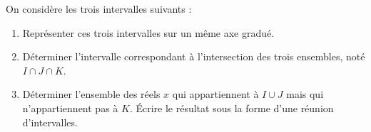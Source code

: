 \begin{exo}{}
	On considère les trois intervalles suivants :
	\begin{enumerate}
		\item Représenter ces trois intervalles sur un même axe gradué.
		\item Déterminer l'intervalle correspondant à l'intersection des trois ensembles, noté $I \cap J \cap K$.
		\item Déterminer l'ensemble des réels $x$ qui appartiennent à $I \cup J$ mais qui n'appartiennent pas à $K$. Écrire le résultat sous la forme d'une réunion d'intervalles.
	\end{enumerate}
\end{exo}
